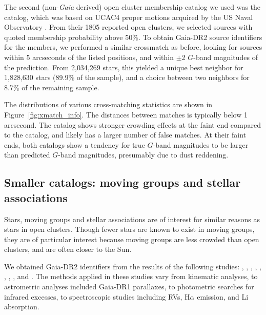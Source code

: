 \documentclass[12pt,twocolumn,tighten]{aastex62}
\begin{document}
The second (non-{\it Gaia} derived) open cluster membership catalog we
used was the \citet{dias_proper_2014} catalog, which was based on
UCAC4 proper motions acquired by the US Naval Observatory
\citep{zacharias_fourth_2013}.
From their 1805 reported open clusters, we selected sources with
quoted membership probability above 50\%.
To obtain Gaia-DR2 source identifiers for the members, we
performed a similar crossmatch as before, looking for sources within 5
arcseconds of the listed positions, and within $\pm$2 $G$-band
magnitudes of the prediction.
From 2{,}034{,}269 stars, this yielded a unique
best neighbor for 1{,}828{,}630 stars (89.9\% of the sample), and a choice
between two neighbors for 8.7\% of the remaining sample. 

The distributions of various cross-matching statistics are shown in
Figure~\ref{fig:xmatch_info}.  The distances between matches is
typically below 1 arcsecond.  The \citeauthor{dias_proper_2014} catalog shows stronger
crowding effects at the faint end compared to the \citeauthor{Kharchenko_et_al_2013} catalog,
and likely has a larger number of false matches.
At their faint ends, both catalogs show a tendency for true $G$-band
magnitudes to be larger than predicted $G$-band magnitudes,
presumably due to dust reddening.


\subsection{Smaller catalogs: moving groups and stellar associations}
\label{subsec:mg}

Stars, moving groups and stellar associations are of interest for
similar reasons as stars in open clusters.  Though fewer stars
are known to exist in moving groups, they are of particular interest
because moving groups are less crowded than open clusters, and are
often closer to the Sun.

We obtained Gaia-DR2 identifiers from the results of the following
studies:
\citet{gagne_banyan_XI_2018},
\citet{gagne_banyan_XII_2018},
\citet{gagne_banyan_XIII_2018},
\citet{kraus_tucanahor_2014},
\citet{roser_deep_2011}, %
\citet{bell_32ori_2017},
\citet{rizzuto_multidimensional_2011},
\citet{oh_comoving_2017}, and
\citet{zari_3d_2018}. The methods applied in these studies
vary from kinematic analyses, to astrometric analyses included
Gaia-DR1 parallaxes, to photometric searches for infrared excesses, to
spectroscopic studies including RVs, H$\alpha$
emission, and Li absorption.
\end{document}
